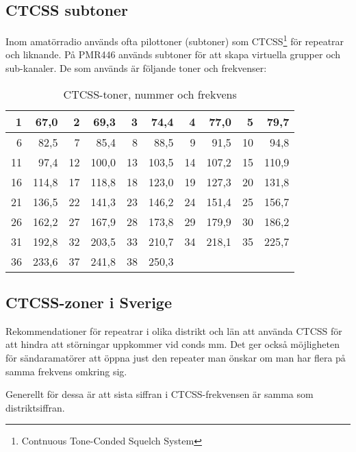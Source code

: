 \subsection{CTCSS subtoner}

Inom amatörradio används ofta pilottoner (subtoner) som
CTCSS\footnote{Contnuous Tone-Conded Squelch System} för repeatrar och
liknande. På PMR446 används subtoner för att skapa virtuella grupper och
sub-kanaler. De som används är följande toner och frekvenser:

\begin{table}[H]
\centering
\begin{tabular}{rr|rr|rr|rr|rr}
	 1 &  67,0 &  2 &  69,3 &  3 &  74,4 &  4 &  77,0 &  5 &  79,7 \\ \hline
	 6 &  82,5 &  7 &  85,4 &  8 &  88,5 &  9 &  91,5 & 10 &  94,8 \\ \hline
	11 &  97,4 & 12 & 100,0 & 13 & 103,5 & 14 & 107,2 & 15 & 110,9 \\ \hline
	16 & 114,8 & 17 & 118,8 & 18 & 123,0 & 19 & 127,3 & 20 & 131,8 \\ \hline
	21 & 136,5 & 22 & 141,3 & 23 & 146,2 & 24 & 151,4 & 25 & 156,7 \\ \hline
	26 & 162,2 & 27 & 167,9 & 28 & 173,8 & 29 & 179,9 & 30 & 186,2 \\ \hline
	31 & 192,8 & 32 & 203,5 & 33 & 210,7 & 34 & 218,1 & 35 & 225,7 \\ \hline
	36 & 233,6 & 37 & 241,8 & 38 & 250,3 &    &       &    &
\end{tabular}
\caption{CTCSS-toner, nummer och frekvens}
\end{table}

\subsection{CTCSS-zoner i Sverige}

Rekommendationer för repeatrar i olika distrikt och län att använda CTCSS för
att hindra att störningar uppkommer vid conds mm. Det ger också möjligheten
för sändaramatörer att öppna just den repeater man önskar om man har flera på
samma frekvens omkring sig.

Generellt för dessa är att sista siffran i CTCSS-frekvensen är samma som
distriktsiffran.

